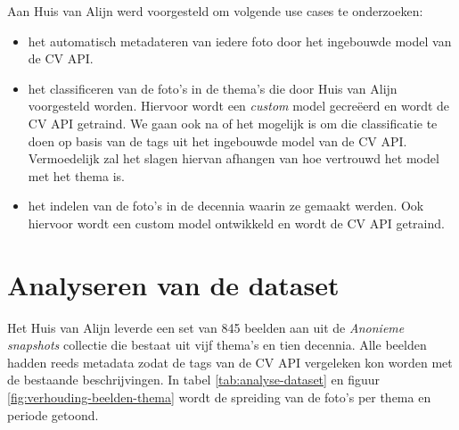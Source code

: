 Aan Huis van Alijn werd voorgesteld om volgende use cases te onderzoeken:
\begin{itemize}
	\item het automatisch metadateren van iedere foto door het ingebouwde model van de CV API.
	\item het classificeren van de foto’s in de thema’s die door Huis van Alijn voorgesteld worden. Hiervoor wordt een \textit{custom} model gecre\"{e}erd en wordt de CV API getraind. We gaan ook na of het mogelijk is om die classificatie te doen op basis van de tags uit het ingebouwde model van de CV API. Vermoedelijk zal het slagen hiervan afhangen van hoe vertrouwd het model met het thema is. 
	\item het indelen van de foto’s in de decennia waarin ze gemaakt werden. Ook hiervoor wordt een custom model ontwikkeld en wordt de CV API getraind.
\end{itemize}

\section{Analyseren van de dataset}
\label{sec:analyseren-van-de-dataset}

Het Huis van Alijn leverde een set van 845 beelden aan uit de \textit{Anonieme snapshots} collectie die bestaat uit vijf thema’s en tien decennia. Alle beelden hadden reeds metadata zodat de tags van de CV API vergeleken kon worden met de bestaande beschrijvingen. In tabel  \ref{tab:analyse-dataset} en figuur \ref{fig:verhouding-beelden-thema} wordt de spreiding van de foto’s per thema en periode getoond.

